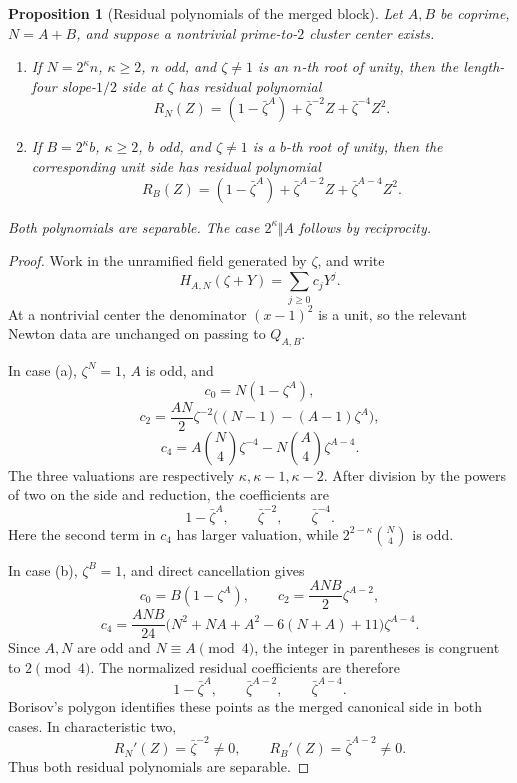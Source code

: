 \documentclass[11pt]{article}
\numberwithin{equation}{section}
\newtheorem{proposition}[theorem]{Proposition}
\theoremstyle{definition}
\begin{document}
\begin{proposition}[Residual polynomials of the merged block]
\label{prop:mergedtwo}
Let \(A,B\) be coprime, \(N=A+B\), and suppose a nontrivial
prime-to-\(2\) cluster center exists.
\begin{enumerate}[label=(\alph*)]
\item If \(N=2^\kappa n\), \(\kappa\geq2\), \(n\) odd, and
\(\zeta\neq1\) is an \(n\)-th root of unity, then the length-four
slope-\(1/2\) side at \(\zeta\) has residual polynomial
\[
 R_N(Z)=(1-\bar\zeta^A)+\bar\zeta^{-2}Z+
        \bar\zeta^{-4}Z^2.
\]
\item If \(B=2^\kappa b\), \(\kappa\geq2\), \(b\) odd, and
\(\zeta\neq1\) is a \(b\)-th root of unity, then the corresponding unit
side has residual polynomial
\[
 R_B(Z)=(1-\bar\zeta^A)+\bar\zeta^{A-2}Z+
        \bar\zeta^{A-4}Z^2.
\]
\end{enumerate}
Both polynomials are separable.  The case \(2^\kappa\Vert A\) follows by
reciprocity.
\end{proposition}

\begin{proof}
Work in the unramified field generated by \(\zeta\), and write
\[
 H_{A,N}(\zeta+Y)=\sum_{j\geq0}c_jY^j.
\]
At a nontrivial center the denominator \((x-1)^2\) is a unit, so the
relevant Newton data are unchanged on passing to \(Q_{A,B}\).

In case (a), \(\zeta^N=1\), \(A\) is odd, and
\[
 c_0=N(1-\zeta^A),
\]
\[
 c_2=\frac{AN}{2}\zeta^{-2}
       \bigl((N-1)-(A-1)\zeta^A\bigr),
\]
\[
 c_4=A\binom N4\zeta^{-4}
      -N\binom A4\zeta^{A-4}.
\]
The three valuations are respectively
\(\kappa,\kappa-1,\kappa-2\).  After division by the powers of two on the
side and reduction, the coefficients are
\[
 1-\bar\zeta^A,
 \qquad \bar\zeta^{-2},
 \qquad \bar\zeta^{-4}.
\]
Here the second term in \(c_4\) has larger valuation, while
\(2^{2-\kappa}\binom N4\) is odd.

In case (b), \(\zeta^B=1\), and direct cancellation gives
\[
 c_0=B(1-\zeta^A),
 \qquad
 c_2=\frac{ANB}{2}\zeta^{A-2},
\]
\[
 c_4=\frac{ANB}{24}
 \bigl(N^2+NA+A^2-6(N+A)+11\bigr)\zeta^{A-4}.
\]
Since \(A,N\) are odd and \(N\equiv A\pmod4\), the integer in parentheses
is congruent to \(2\pmod4\).  The normalized residual coefficients are
therefore
\[
 1-\bar\zeta^A,
 \qquad \bar\zeta^{A-2},
 \qquad \bar\zeta^{A-4}.
\]
Borisov's polygon identifies these points as the merged canonical side in
both cases.  In characteristic two,
\[
 R_N'(Z)=\bar\zeta^{-2}\neq0,
 \qquad
 R_B'(Z)=\bar\zeta^{A-2}\neq0.
\]
Thus both residual polynomials are separable.
\end{proof}
\end{document}
